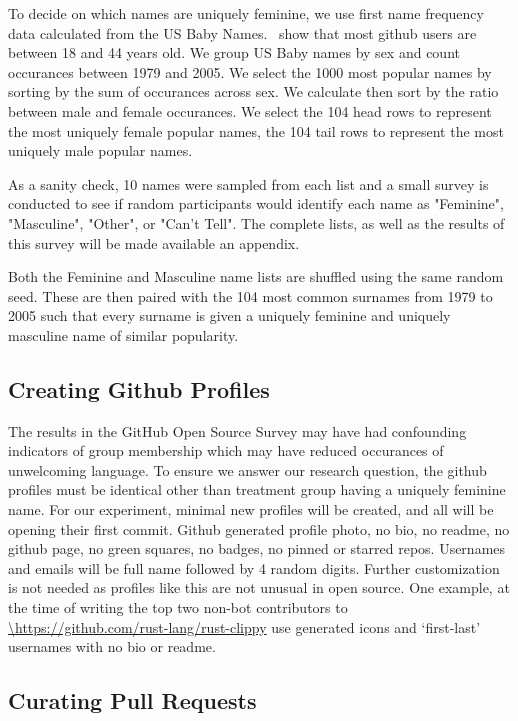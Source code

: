 \documentclass[journal,12pt,onecolumn,]{IEEEtran}
\begin{document}
To decide on which names are uniquely feminine, we use first name frequency data calculated from the US Baby Names.~\cite{names}
\citet{geiger17} show that most github users are between 18 and 44 years old.
We group US Baby names by sex and count occurances between 1979 and 2005.
We select the 1000 most popular names by sorting by the sum of occurances across sex.
We calculate then sort by the ratio between male and female occurances.
We select the 104 head rows to represent the most uniquely female popular names, the 104 tail rows to represent the most uniquely male popular names.

As a sanity check, 10 names were sampled from each list and a small survey is conducted to see if random participants would identify each name as "Feminine", "Masculine", "Other", or "Can't Tell".
The complete lists, as well as the results of this survey will be made available an appendix.

Both the Feminine and Masculine name lists are shuffled using the same random seed.
These are then paired with the 104 most common surnames from 1979 to 2005 such that every surname is given a uniquely feminine and uniquely masculine name of similar popularity.

\subsection{Creating Github Profiles}

The results in the GitHub Open Source Survey may have had confounding indicators of group membership which may have reduced occurances of unwelcoming language.
To ensure we answer our research question, the github profiles must be identical other than treatment group having a uniquely feminine name.
For our experiment, minimal new profiles will be created, and all will be opening their first commit.
Github generated profile photo, no bio, no readme, no github page, no green squares, no badges, no pinned or starred repos.
Usernames and emails will be full name followed by 4 random digits.
Further customization is not needed as profiles like this are not unusual in open source.
One example, at the time of writing the top two non-bot contributors to \url{\https://github.com/rust-lang/rust-clippy} use generated icons and `first-last' usernames with no bio or readme.

\subsection{Curating Pull Requests} %
\end{document}
